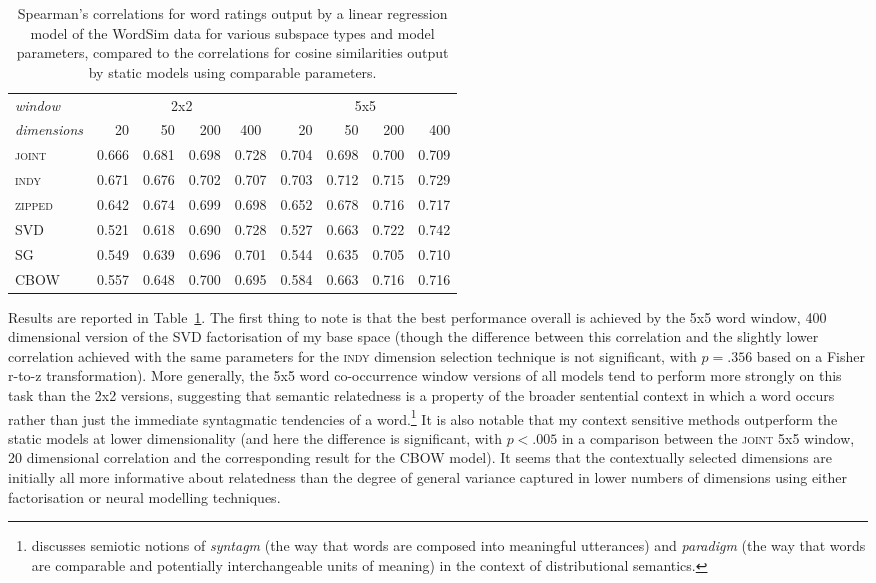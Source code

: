 \begin{table}
\centering
\begin{tabular}{lrrrr|rrrr}
\hline
\emph{window} & \multicolumn{4}{c}{2x2} & \multicolumn{4}{c}{5x5} \\
\emph{dimensions} & 20 & 50 & 200 & \multicolumn{1}{c}{400} & 20 & 50 & 200 & 400 \\
\hline
\textsc{joint} & 0.666 & 0.681 & 0.698 & 0.728 & 0.704 & 0.698 & 0.700 & 0.709 \\
\textsc{indy} & 0.671 & 0.676 & 0.702 & 0.707 & 0.703 & 0.712 & 0.715 & 0.729 \\
\textsc{zipped} & 0.642 & 0.674 & 0.699 & 0.698 & 0.652 & 0.678 & 0.716 & 0.717 \\
\textsc{SVD} & 0.521 & 0.618 & 0.690 & 0.728 & 0.527 & 0.663 & 0.722 & 0.742 \\
\textsc{SG} & 0.549 & 0.639 & 0.696 & 0.701 & 0.544 & 0.635 & 0.705 & 0.710 \\
\textsc{CBOW} & 0.557 & 0.648 & 0.700 & 0.695 & 0.584 & 0.663 & 0.716 & 0.716 \\
\hline
\end{tabular}
\caption{Spearman's correlations for word ratings output by a linear regression model of the WordSim data for various subspace types and model parameters, compared to the correlations for cosine similarities output by static models using comparable parameters.}
\label{tab:related}
\end{table}

Results are reported in Table~\ref{tab:related}.  The first thing to note is that the best performance overall is achieved by the 5x5 word window, 400 dimensional version of the SVD factorisation of my base space (though the difference between this correlation and the slightly lower correlation achieved with the same parameters for the \textsc{indy} dimension selection technique is not significant, with $p = .356$ based on a Fisher r-to-z transformation).  More generally, the 5x5 word co-occurrence window versions of all models tend to perform more strongly on this task than the 2x2 versions, suggesting that semantic relatedness is a property of the broader sentential context in which a word occurs rather than just the immediate syntagmatic tendencies of a word.\footnote{\cite{Sahlgren} discusses  semiotic notions of \emph{syntagm} (the way that words are composed into meaningful utterances) and \emph{paradigm} (the way that words are comparable and potentially interchangeable units of meaning) in the context of distributional semantics.}  It is also notable that my context sensitive methods outperform the static models at lower dimensionality (and here the difference is significant, with $p < .005$ in a comparison between the \textsc{joint} 5x5 window, 20 dimensional correlation and the corresponding result for the \textsc{CBOW} model).  It seems that the contextually selected dimensions are initially all more informative about relatedness than the degree of general variance captured in lower numbers of dimensions using either factorisation or neural modelling techniques.


